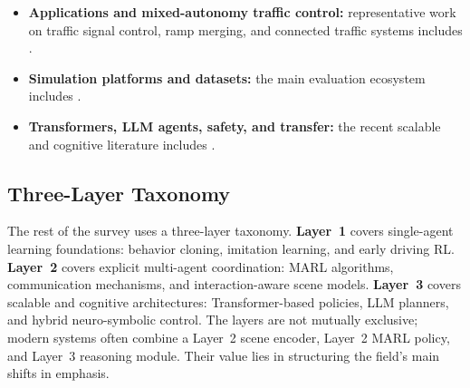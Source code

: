 \documentclass[12pt, a4paper]{article}
\begin{document}
\begin{itemize}[leftmargin=*,itemsep=0.25em,topsep=0.3em]
  \item \textbf{Applications and mixed-autonomy traffic control:}
  representative work on traffic signal control, ramp merging, and connected
  traffic systems includes
  \cite{wei2019colight,wei2019presslight,zheng2019learning,wang2018urban,wu2017flow,stern2018dissipation,talebpour2016influence,isele2018navigating,shalev2016safe,palanisamy2020multi}.

  \item \textbf{Simulation platforms and datasets:}
  the main evaluation ecosystem includes
  \cite{dosovitskiy2017carlaopenurbandriving,krajzewicz2012recent,zhou2020smarts,caesar2020nuscenes,caesar2021nuplan,chang2019argoverse,ettinger2021large,waymo2021open,samvelyan2019starcraft,papoudakis2021benchmarking}.

  \item \textbf{Transformers, LLM agents, safety, and transfer:}
  the recent scalable and cognitive literature includes
  \cite{vaswani2017attention,wen2022multi,chen2021decision,janner2021offline,parisotto2020stabilizing,brown2020language,fu2023drive,wen2023dilu,mao2023gpt,sha2023languagempc,wang2023voyager,achiam2017constrained,alshiekh2018safe,prashanth2016variance,tobin2017domain,finn2017model,he2016opponent,zhang2018fully,li2020deep}.
\end{itemize}

\subsection{Three-Layer Taxonomy}
\label{sec:taxonomy}

The rest of the survey uses a three-layer taxonomy. \textbf{Layer~1} covers
single-agent learning foundations: behavior cloning, imitation learning, and
early driving RL. \textbf{Layer~2} covers explicit multi-agent coordination:
MARL algorithms, communication mechanisms, and interaction-aware scene models.
\textbf{Layer~3} covers scalable and cognitive architectures: Transformer-based
policies, LLM planners, and hybrid neuro-symbolic control. The layers are not
mutually exclusive; modern systems often combine a Layer~2 scene encoder,
Layer~2 MARL policy, and Layer~3 reasoning module. Their value lies in
structuring the field's main shifts in emphasis.
\end{document}
